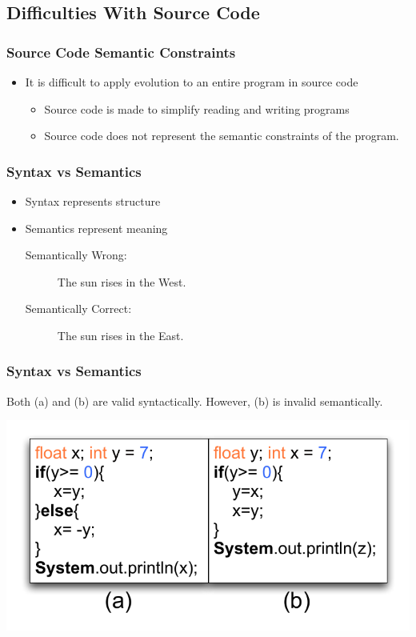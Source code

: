 \documentclass{beamer}
\begin{document}
\subsection{Difficulties With Source Code}
\begin{frame}
	\frametitle{Source Code Semantic Constraints}
	\begin{itemize}
		\item It is difficult to apply evolution to an entire program in source code
			\\
		\begin{itemize}
			\item Source code is made to simplify reading and writing programs
			\item Source code does not represent the semantic constraints of the program.
		\end{itemize}
	\end{itemize}	
\end{frame}

\begin{frame}
	\frametitle{Syntax vs Semantics}
\begin{itemize}
\item Syntax represents structure
\item Semantics represent meaning
	\\
\begin{description}

\item[Semantically Wrong:] The sun rises in the West.  
\item[Semantically Correct:] The sun rises in the East.
\end{description}
\end{itemize}

\end{frame}


\begin{frame}[fragile]
	\frametitle{Syntax vs Semantics}
	Both (a) and (b) are valid syntactically. However, (b) is invalid semantically.
	
	
   \includegraphics[width=1\textwidth]{Illustrations/semantics.pdf}


\end{frame}
\end{document}
